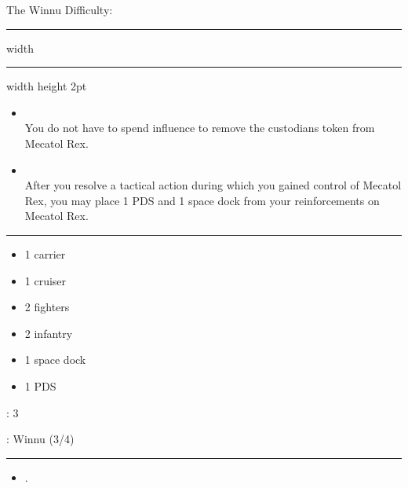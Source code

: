 \newpage
{\handel\Huge The Winnu} \hfill {\Large Difficulty: \hard} \vspace{-4pt}\\
\hrule width \hsize \kern 1mm \hrule width \hsize height 2pt


\begin{multicols}{2}


\begin{itemize}
\item {}\\
You do not have to spend influence to remove the custodians token from Mecatol Rex.
\item {}\\
After you resolve a tactical action during which you gained control of Mecatol Rex, you may place 1 PDS and 1 space dock from your reinforcements on Mecatol Rex.
\end{itemize}


\vspace{-10pt}\rule{\hsize}{0.4pt}\vspace{5pt}


\vspace{-5pt}
\begin{multicols}{2}
\begin{itemize}
\item 1 carrier
\item 1 cruiser
\item 2 fighters
\item 2 infantry
\item 1 space dock
\item 1 PDS
\end{itemize}
\end{multicols}

\vspace{-5pt}
: 3

\vspace{2pt}
: Winnu (3/4)

\rule{\hsize}{0.4pt}\vspace{5pt}


\begin{itemize}
\item {}.
\end{itemize}


\end{multicols}
